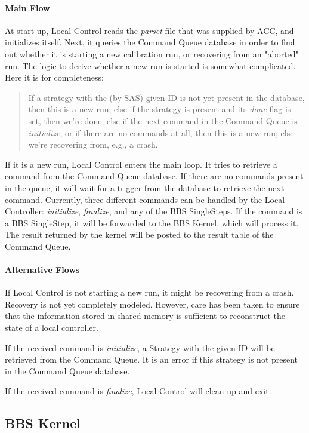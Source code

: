 \documentclass[10pt]{lofar}
\begin{document}
\paragraph*{Main Flow}
At start-up, Local Control reads the \emph{parset} file that was supplied by
ACC, and initializes itself. Next, it queries the Command Queue database in
order to find out whether it is starting a new calibration run, or recovering
from an "aborted" run. The logic to derive whether a new run is started is
somewhat complicated. Here it is for completeness:
\begin{quote}
If a strategy with the (by SAS) given ID is not yet present in the database,
then this is a new run; else if the strategy is present and its \textit{done}
flag is set, then we're done; else if the next command in the Command Queue is
\textit{initialize}, or if there are no commands at all, then this is a new
run; else we're recovering from, e.g., a crash.
\end{quote}
If it is a new run, Local Control enters the main loop. It tries to retrieve a
command from the Command Queue database. If there are no commands present in
the queue, it will wait for a trigger from the database to retrieve the next
command. Currently, three different commands can be handled by the Local
Controller: \textit{initialize}, \textit{finalize}, and any of the BBS
SingleSteps. If the command is a BBS SingleStep, it will be forwarded to the
BBS Kernel, which will process it. The result returned by the kernel will be
posted to the result table of the Command Queue. 

\paragraph*{Alternative Flows}
If Local Control is not starting a new run, it might be recovering from a
crash. Recovery is not yet completely modeled. However, care has been taken
to ensure that the information stored in shared memory is sufficient to
reconstruct the state of a local controller.

If the received command is \textit{initialize}, a Strategy with the given ID
will be retrieved from the Command Queue. It is an error if this strategy is not
present in the Command Queue database.

If the received command is \textit{finalize}, Local Control will clean up and
exit.

\subsection{BBS Kernel}
\label{subsec:design-kernel}
\end{document}

